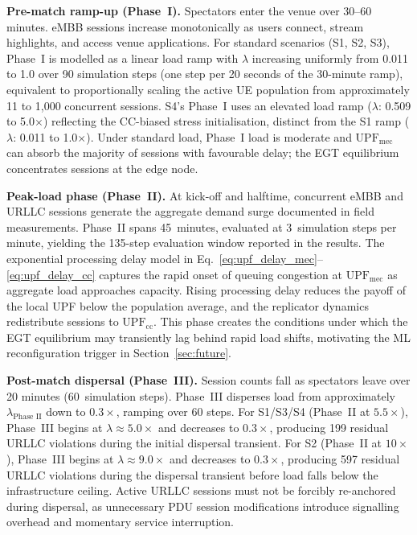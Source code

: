 \documentclass[conference]{IEEEtran}
\begin{document}
\textbf{Pre-match ramp-up (Phase~I).} Spectators enter
the venue over 30--60 minutes. eMBB sessions increase
monotonically as users connect, stream highlights, and
access venue applications. For standard scenarios (S1, S2, S3),
Phase~I is modelled as a linear load ramp with $\lambda$
increasing uniformly from 0.011 to 1.0 over 90 simulation steps
(one step per 20 seconds of the 30-minute ramp), equivalent to
proportionally scaling the active UE population from
approximately 11 to 1,000 concurrent sessions. S4's Phase~I
uses an elevated load ramp ($\lambda$: 0.509 to 5.0$\times$)
reflecting the CC-biased stress initialisation, distinct from
the S1 ramp ($\lambda$: 0.011 to 1.0$\times$). Under standard
load, Phase~I load is moderate and $\text{UPF}_\text{mec}$ can
absorb the majority of sessions with favourable delay; the EGT
equilibrium concentrates sessions at the edge node.

\textbf{Peak-load phase (Phase~II).} At kick-off and
halftime, concurrent eMBB and URLLC sessions generate
the aggregate demand surge documented in field
measurements. Phase~II spans 45~minutes, evaluated at
3~simulation steps per minute, yielding the 135-step
evaluation window reported in the results.
The exponential processing delay model in
Eq.~\eqref{eq:upf_delay_mec}--\eqref{eq:upf_delay_cc}
captures the rapid onset of queuing congestion at
$\text{UPF}_\text{mec}$ as aggregate load approaches
capacity. Rising processing delay reduces the payoff of
the local UPF below the population average, and the
replicator dynamics redistribute sessions to
$\text{UPF}_\text{cc}$. This phase creates the
conditions under which the EGT equilibrium may
transiently lag behind rapid load shifts, motivating
the ML reconfiguration trigger in Section~\ref{sec:future}.

\textbf{Post-match dispersal (Phase~III).} Session
counts fall as spectators leave over 20 minutes
(60~simulation steps). Phase~III disperses load from
approximately $\lambda_{\text{Phase~II}}$ down to $0.3\times$,
ramping over 60 steps. For S1/S3/S4 (Phase~II at
$5.5\times$), Phase~III begins at $\lambda \approx 5.0\times$
and decreases to $0.3\times$, producing 199 residual URLLC
violations during the initial dispersal transient. For S2
(Phase~II at $10\times$), Phase~III begins at $\lambda \approx
9.0\times$ and decreases to $0.3\times$, producing 597 residual
URLLC violations during the dispersal transient before load
falls below the infrastructure ceiling. Active
URLLC sessions must not be forcibly re-anchored
during dispersal, as unnecessary PDU session
modifications introduce signalling overhead and
momentary service interruption.
\end{document}
